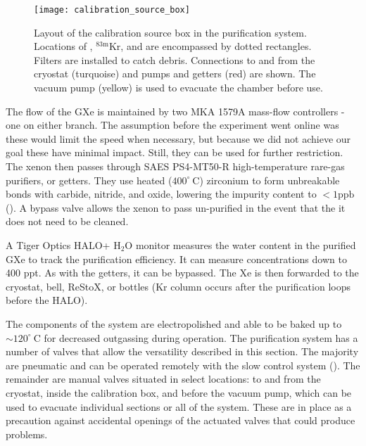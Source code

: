 \begin{figure}
\centering
\texttt{[image: calibration\_source\_box]}
\caption{Layout of the calibration source box in the purification system.  Locations of , $^{83\mathrm{m}}\mathrm{Kr}$, and
 are encompassed by dotted rectangles.  Filters are installed to catch debris.  Connections to and from the cryostat (turquoise)
and pumps and getters (red) are shown.  The vacuum pump (yellow) is used to evacuate the chamber before use.}
\label{fig:xenon1t_pur_cal_box_schematic}
\end{figure}

The flow of the GXe is maintained by two MKA 1579A mass-flow controllers - one on either branch.  The assumption before the experiment went
online was these would limit the speed when necessary, but because we did not achieve our goal these have minimal impact.  Still, they can
be used for further restriction.  The xenon then passes through SAES PS4-MT50-R high-temperature rare-gas purifiers, or getters.  They
use heated ($400^{\circ}\ \mathrm{C}$) zirconium to form unbreakable bonds with carbide, nitride, and oxide, lowering the impurity content
to $< 1 \mathrm{ppb}$ ().  A bypass valve allows the xenon to pass un-purified in the event that the it does not need
to be cleaned.

A Tiger Optics HALO+ H$_2$O monitor measures the water content in the purified GXe to track the purification efficiency.  It can measure
concentrations down to 400 ppt.  As with the getters, it can be bypassed.  The Xe is then forwarded to the cryostat, bell, ReStoX, or
bottles (Kr column occurs after the purification loops before the HALO).

The components of the system are electropolished and able to be baked up to ${\sim} 120^{\circ}\ \mathrm{C}$ for decreased outgassing during
operation.  The purification system has a number of valves that allow the versatility described in this section.  The majority are
pneumatic and can
be operated remotely with the slow control system ().  The remainder are manual valves
situated in select locations: to and from the cryostat,
inside the calibration box, and before the vacuum pump, which can be used to evacuate individual sections or all of the system.  These are
in place as a precaution against accidental openings of the actuated valves that could produce problems.


